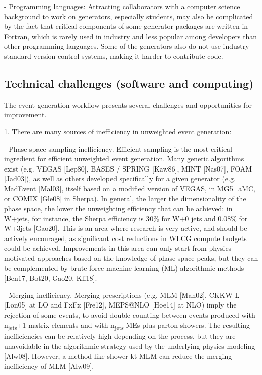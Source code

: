 \documentclass[11pt,a4paper]{article}
\begin{document}
- {Programming languages}: Attracting collaborators with a computer
science background to work on generators, especially students, may also
be complicated by the fact that critical components of some generator
packages are written in Fortran, which is rarely used in industry and
less popular among developers than other programming languages. Some of
the generators also do not use industry standard version control
systems, making it harder to contribute code.

\hypertarget{technical-challenges-software-and-computing}{%
\subsection{Technical challenges (software and
computing)}\label{technical-challenges-software-and-computing}}

The event generation workflow presents several challenges and
opportunities for improvement.

1. There are many sources of inefficiency in unweighted event
generation:

- {Phase space sampling inefficiency}. Efficient sampling is the most
critical ingredient for efficient unweighted event generation. Many
generic algorithms exist (e.g. VEGAS {[}Lep80{]}, BASES / SPRING
{[}Kaw86{]}, MINT {[}Nas07{]}, FOAM {[}Jad03{]}), as well as others
developed specifically for a given generator (e.g. MadEvent {[}Mal03{]},
itself based on a modified version of VEGAS, in MG5\_aMC, or COMIX
{[}Gle08{]} in Sherpa). In general, the larger the dimensionality of the
phase space, the lower the unweighting efficiency that can be achieved:
in W+jets, for instance, the Sherpa efficiency is 30\% for W+0 jets and
0.08\% for W+3jets {[}Gao20{]}. This is an area where research is very
active, and should be actively encouraged, as significant cost
reductions in WLCG compute budgets could be achieved. Improvements in
this area can only start from physics-motivated approaches based on the
knowledge of phase space peaks, but they can be complemented by
brute-force machine learning (ML) algorithmic methods {[}Ben17, Bot20,
Gao20, Kli18{]}.

- {Merging inefficiency}. Merging prescriptions (e.g. MLM {[}Man02{]},
CKKW-L {[}Lon05{]} at LO and FxFx {[}Fre12{]}, MEPS@NLO {[}Hoe14{]} at
NLO) imply the rejection of some events, to avoid double counting
between events produced with n\textsubscript{jets}+1 matrix elements and
with n\textsubscript{jets} MEs plus parton showers. The resulting
inefficiencies can be relatively high depending on the process, but they
are unavoidable in the algorithmic strategy used by the underlying
physics modeling {[}Alw08{]}. However, a method like shower-kt MLM can
reduce the merging inefficiency of MLM {[}Alw09{]}.
\end{document}
